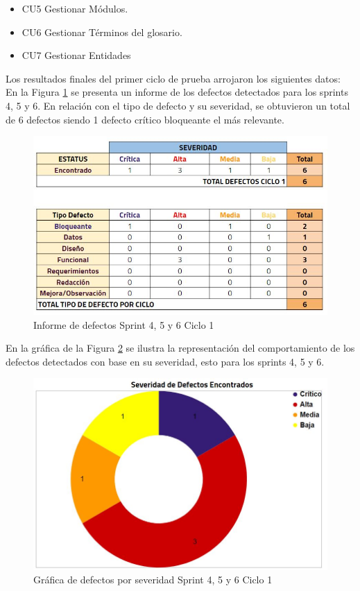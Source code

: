 \begin{itemize}
	\item CU5 Gestionar Módulos.
	\item CU6 Gestionar Términos del glosario.
	\item CU7 Gestionar Entidades
\end{itemize}

Los resultados finales del primer ciclo de prueba arrojaron los siguientes datos:\\

En la Figura \ref{fig:infos4c2} se presenta un informe de los defectos detectados para los sprints 4, 5 y 6. En relación con el tipo de defecto y su severidad, se obtuvieron un total de 6 defectos siendo 1 defecto crítico bloqueante el más relevante.

\begin{figure}[H]
	\begin{center}
		\includegraphics[width=.95\textwidth]{images/pruebas/s4c2}
		\caption{Informe de defectos Sprint 4, 5 y 6  Ciclo 1}
		\label{fig:infos4c2}
	\end{center}
\end{figure}

En la gráfica de la Figura \ref{fig:infos4c2-1} se ilustra la representación del comportamiento de los defectos detectados con base en su severidad, esto para los sprints 4, 5 y 6.

\begin{figure}[H]
	\begin{center}
		\includegraphics[width=.65\textwidth]{images/pruebas/s4c2-1}
		\caption{Gráfica de defectos por severidad Sprint 4, 5 y 6  Ciclo 1}
		\label{fig:infos4c2-1}
	\end{center}
\end{figure}


